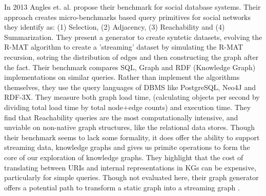 \documentclass[sigconf,anonymous, authordraft]{acmart}
\begin{document}
\par{In 2013 Angles et. al. propose their benchmark for social database systems. 
Their approach creates micro-benchmarks based query primitives for social networks they identify as: (1) Selection, (2) Adjacency, (3) Reachability and (4) Summarization. 
They present a generator to create syntetic datasets, evolving the R-MAT algorithm to create a 'streaming' dataset by simulating the R-MAT recursion, sotring the distribution of edges and then constructing the graph after the fact. 
Their benchmark compares SQL, Graph and RDF (Knowledge Graph) implementations on similar queries. 
Rather than implement the algorithms themselves, they use the query languages of DBMS like PostgreSQL, Neo4J and RDF-3X.
They measure both graph load time, (calculating objects per second by dividing total load time by total node+edge counts) and execution time. 
They find that Reachability queries are the most computationally intensive, and unviable on non-native graph structures, like the relational data stores. 
Though their benchmark seems to lack some formality, it does offer the ability to support streaming data, knowledge graphs and gives us primite operations to form the core of our exploration of knowledge graphs. They highlight that the cost of translating between URIs and internal representations in KGs can be expensive, particularly for simple queries. 
Though not evaluated here, their graph generator offers a potential path to transform a static graph into a streaming graph \cite{Angles2013}.}
\end{document}
